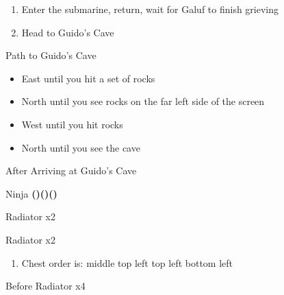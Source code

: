 \begin{paracol}{2}
\begin{enumerate}[resume]
    \item Enter the submarine, return, wait for Galuf to finish grieving
    \item Head to Guido's Cave
\end{enumerate}

\begin{misc}{Path to Guido's Cave}
    \begin{itemize}
        \item East until you hit a set of rocks
        \item North until you see rocks on the far left side of the screen
        \item West until you hit rocks
        \item North until you see the cave
    \end{itemize}
\end{misc}

\begin{menu}{After Arriving at Guido's Cave}
    \varwb
    \begin{jobMenu}
        \bartz Ninja \textbf{(\pointLeft)(\pointDown)(\pointLeft)} \ability{!\escape} \optimize
    \end{jobMenu}
    \varwe
\end{menu}

\switchcolumn*
\begin{steproute}{Radiator x2}
\end{steproute}

\switchcolumn
\begin{encounter}{Radiator x2}
	\varwb
	\begin{notes}
		\item {}
	\end{notes}
	\begin{round}{1}
		\bartz \leftCommand{\throw} \then \flameScroll
	\end{round}
	\varwe
\end{encounter}

\newpage
\begin{enumerate}[resume]
    \item Chest order is: middle \then top left \then {} \then top left \then bottom left
\end{enumerate}

\switchcolumn
\begin{steproute}{Before Radiator x4}
\end{steproute}


\end{paracol}
